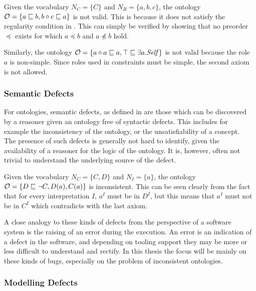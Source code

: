 \begin{example}
  Given the vocabulary $N_C = \{ C \}$ and $N_R = \{ a, b, c \}$, the \SROIQ ontology $\mathcal{O} = \{ a \sqsubseteq b, b \circ c \sqsubseteq a \}$ is not valid. This is because it does not satisfy the regularity condition in \SROIQ. This can simply be verified by showing that no preorder $\preceq$ exists for which $a \preceq b$ and $a \not\preceq b$ hold.

  Similarly, the ontology $\mathcal{O} = \{ a \circ a \sqsubseteq a, \top \sqsubseteq \exists a.\mathit{Self} \}$ is not valid because the role $a$ is non-simple. Since roles used in \self constraints must be simple, the second axiom is not allowed.
\end{example}

\subsubsection{Semantic Defects} \label{semantic-defects}

For ontologies, semantic defects, as defined in \cite{kalyanpur2005debugging}  are those which can be discovered by a reasoner given an ontology free of syntactic defects. This includes for example the inconsistency of the ontology, or the unsatisfiability of a concept. The presence of such defects is generally not hard to identify, given the availability of a reasoner for the logic of the ontology. It is, however, often not trivial to understand the underlying source of the defect.

\begin{example}
  Given the vocabulary $N_C = \{ C, D \}$ and $N_I = \{ a \}$, the \SROIQ ontology $\mathcal{O} = \{ D \sqsubseteq \lnot C, D(a), C(a) \}$ is inconsistent. This can be seen clearly from the fact that for every interpretation $I$, $a^I$ must be in $D^I$, but this means that $a^I$ must not be in $C^I$ which contradicts with the last axiom.
\end{example}

A close analogy to these kinds of defects from the perspective of a software system is the raising of an error during the execution. An error is an indication of a defect in the software, and depending on tooling support they may be more or less difficult to understand and rectify. In this thesis the focus will be mainly on these kinds of bugs, especially on the problem of inconsistent ontologies.

\subsubsection{Modelling Defects} \label{modelling-defects}

